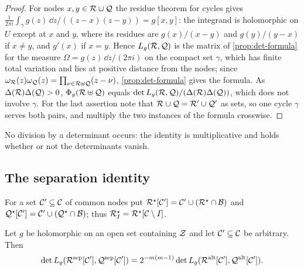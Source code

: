 \begin{proof}
For nodes $x,y\in\mathcal{R}\cup\mathcal{Q}$ the residue theorem for cycles gives
$\frac1{2\pi i}\int_\gamma g(z)\,\dd z/((z-x)(z-y))=g[x,y]$: the integrand is holomorphic on
$U$ except at $x$ and $y$, where its residues are $g(x)/(x-y)$ and $g(y)/(y-x)$ if $x\ne y$, and
$g'(x)$ if $x=y$. Hence $L_g(\mathcal{R},\mathcal{Q})$ is the matrix of \cref{prop:det-formula} for the measure
$\Omega=g(z)\,\dd z/(2\pi i)$ on the compact set $\gamma$, which has finite total variation and
lies at positive distance from the nodes; since
$\omega_{\mathcal{R}}(z)\omega_{\mathcal{Q}}(z)=\prod_{\nu\in\mathcal{R}\uplus\mathcal{Q}}(z-\nu)$, \cref{prop:det-formula} gives the
formula. As $\Delta(\mathcal{R})\Delta(\mathcal{Q})>0$, $\Phi_g(\mathcal{R}\uplus\mathcal{Q})$ equals
$\det L_g(\mathcal{R},\mathcal{Q})/(\Delta(\mathcal{R})\Delta(\mathcal{Q}))$, which does not involve $\gamma$. For the last
assertion note that $\mathcal{R}\cup\mathcal{Q}=\mathcal{R}'\cup\mathcal{Q}'$ as sets, so one cycle $\gamma$ serves both pairs,
and multiply the two instances of the formula crosswise.
\end{proof}

No division by a determinant occurs: the identity is multiplicative and holds whether or not
the determinants vanish.

\subsection{The separation identity}\label{subsec:separation}

For a set $\mathcal{C}'\subseteq\mathcal{C}$ of common nodes put $\mathcal{R}^\star[\mathcal{C}']=\mathcal{C}'\cup(\mathcal{R}^\star\cap\mathcal{B})$
and $\mathcal{Q}^\star[\mathcal{C}']=\mathcal{C}'\cup(\mathcal{Q}^\star\cap\mathcal{B})$; thus $\mathcal{R}^\star_I=\mathcal{R}^\star[\mathcal{C}\setminus I]$.

\begin{corollary}\label{cor:separation-lowner}
Let $g$ be holomorphic on an open set containing $\mathcal{Z}$ and let $\mathcal{C}'\subseteq\mathcal{C}$ be arbitrary.
Then
\[
  \det L_g(\mathcal{R}^{\mathrm{sep}}[\mathcal{C}'],\mathcal{Q}^{\mathrm{sep}}[\mathcal{C}'])
  =2^{-m(m-1)}\det L_g(\mathcal{R}^{\mathrm{alt}}[\mathcal{C}'],\mathcal{Q}^{\mathrm{alt}}[\mathcal{C}']).
\]
\end{corollary}

